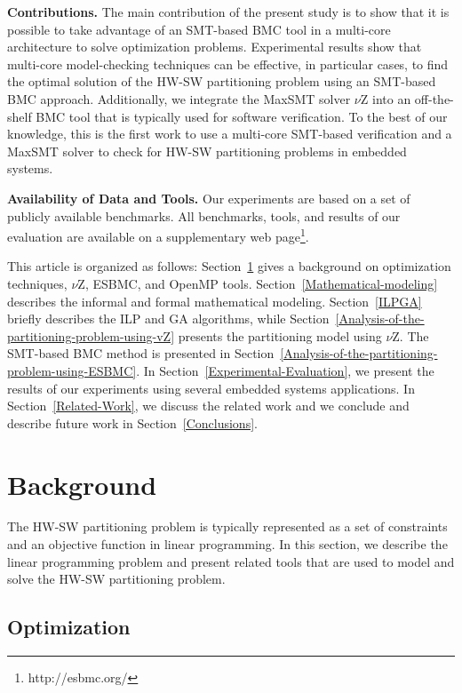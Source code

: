 \textbf{Contributions.} The main contribution of the present study is to show that it is possible to take advantage of an SMT-based BMC tool in a multi-core architecture to solve optimization problems. Experimental results show that multi-core model-checking techniques can be effective, in particular cases, to find the optimal solution of the HW-SW partitioning problem using an SMT-based BMC approach. Additionally, we integrate the MaxSMT solver $\nu$Z into an off-the-shelf BMC tool that is typically used for software verification. To the best of our knowledge, this is the first work to use a multi-core SMT-based verification and a MaxSMT solver to check for HW-SW partitioning problems in embedded systems.

\textbf{Availability of Data and Tools. }Our experiments are based on a set of publicly available benchmarks. All benchmarks, tools, and results of our evaluation are available on a supplementary web page\footnote{http://esbmc.org/}.

This article is organized as follows: Section~\ref{background} gives a background on optimization techniques, $\nu$Z, ESBMC, and OpenMP tools. 
Section~\ref{Mathematical-modeling} describes the informal and formal mathematical modeling. Section~\ref{ILPGA} briefly describes the ILP and GA algorithms, while Section~\ref{Analysis-of-the-partitioning-problem-using-vZ} presents the partitioning model using $\nu$Z. The SMT-based BMC method is presented in Section~\ref{Analysis-of-the-partitioning-problem-using-ESBMC}. In Section~\ref{Experimental-Evaluation}, we present the results of our experiments using several embedded systems applications. In Section~\ref{Related-Work}, we discuss the related work and we conclude and describe future work in Section~\ref{Conclusions}.

\section{Background}
\label{background}

The HW-SW partitioning problem is typically represented as a set of constraints and an objective function in linear programming. In this section, we describe the linear programming problem and present related tools that are used to model and solve the HW-SW partitioning problem.

\subsection{Optimization}
\label{Optimization}

